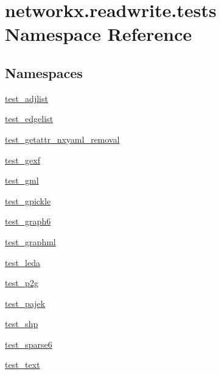 \hypertarget{namespacenetworkx_1_1readwrite_1_1tests}{}\section{networkx.\+readwrite.\+tests Namespace Reference}
\label{namespacenetworkx_1_1readwrite_1_1tests}
\subsection*{Namespaces}
\begin{DoxyCompactItemize}
\item 
 \hyperlink{namespacenetworkx_1_1readwrite_1_1tests_1_1test__adjlist}{test\+\_\+adjlist}
\item 
 \hyperlink{namespacenetworkx_1_1readwrite_1_1tests_1_1test__edgelist}{test\+\_\+edgelist}
\item 
 \hyperlink{namespacenetworkx_1_1readwrite_1_1tests_1_1test__getattr__nxyaml__removal}{test\+\_\+getattr\+\_\+nxyaml\+\_\+removal}
\item 
 \hyperlink{namespacenetworkx_1_1readwrite_1_1tests_1_1test__gexf}{test\+\_\+gexf}
\item 
 \hyperlink{namespacenetworkx_1_1readwrite_1_1tests_1_1test__gml}{test\+\_\+gml}
\item 
 \hyperlink{namespacenetworkx_1_1readwrite_1_1tests_1_1test__gpickle}{test\+\_\+gpickle}
\item 
 \hyperlink{namespacenetworkx_1_1readwrite_1_1tests_1_1test__graph6}{test\+\_\+graph6}
\item 
 \hyperlink{namespacenetworkx_1_1readwrite_1_1tests_1_1test__graphml}{test\+\_\+graphml}
\item 
 \hyperlink{namespacenetworkx_1_1readwrite_1_1tests_1_1test__leda}{test\+\_\+leda}
\item 
 \hyperlink{namespacenetworkx_1_1readwrite_1_1tests_1_1test__p2g}{test\+\_\+p2g}
\item 
 \hyperlink{namespacenetworkx_1_1readwrite_1_1tests_1_1test__pajek}{test\+\_\+pajek}
\item 
 \hyperlink{namespacenetworkx_1_1readwrite_1_1tests_1_1test__shp}{test\+\_\+shp}
\item 
 \hyperlink{namespacenetworkx_1_1readwrite_1_1tests_1_1test__sparse6}{test\+\_\+sparse6}
\item 
 \hyperlink{namespacenetworkx_1_1readwrite_1_1tests_1_1test__text}{test\+\_\+text}
\end{DoxyCompactItemize}
